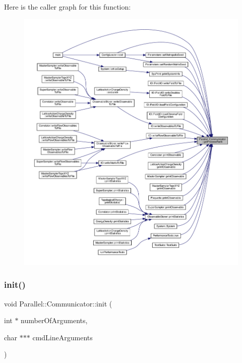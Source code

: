 Here is the caller graph for this function\+:
\nopagebreak
\begin{figure}[H]
\begin{center}
\leavevmode
\includegraphics[width=350pt]{class_parallel_1_1_communicator_a474ab433da0e83ef372d74e26a7e5cb0_icgraph}
\end{center}
\end{figure}
\mbox{\label{class_parallel_1_1_communicator_adc9248c5a0defbbf55bfca988bfd9e96}} 
\subsubsection{\texorpdfstring{init()}{init()}}
{\footnotesize\ttfamily void Parallel\+::\+Communicator\+::init (\begin{DoxyParamCaption}\item[{int $\ast$}]{number\+Of\+Arguments,  }\item[{char $\ast$$\ast$$\ast$}]{cmd\+Line\+Arguments }\end{DoxyParamCaption})\hspace{0.3cm}{\ttfamily [static]}}

